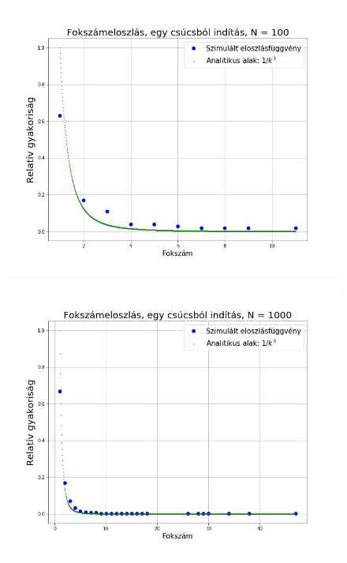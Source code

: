 \documentclass[a4paper, 12pt]{article}
\numberwithin{equation}{section}          %
\numberwithin{figure}{subsection}
\begin{document}
\begin{figure}[h!]
	\begin{center}
		\includegraphics[width=1\textwidth]{elso100.png}
	\end{center}
\end{figure}
\clearpage

\begin{figure}[c]
	\begin{center}
		\includegraphics[width=1\textwidth]{elso1000.png}
	\end{center}
\end{figure}
\end{document}
